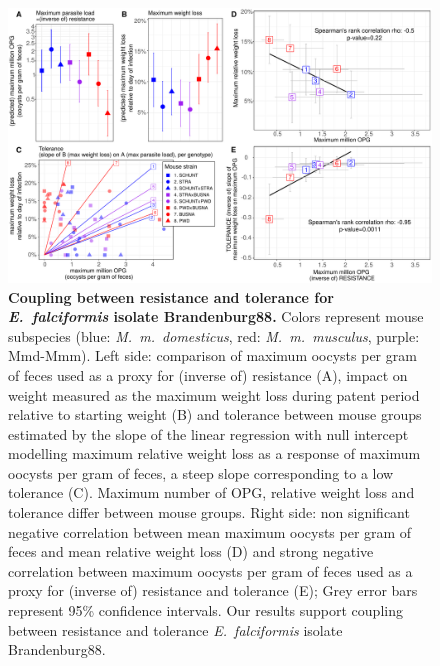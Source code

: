 \documentclass[12pt]{article}
\begin{document}
\begin{figure}[H]
    \centering
    \includegraphics[width=\linewidth,height=\textheight,keepaspectratio]{images/Fig5_final.pdf}
    \caption{\textbf{Coupling between resistance and tolerance for \textit{E.~falciformis} isolate Brandenburg88.} Colors represent mouse subspecies (blue: \textit{M.~m.~domesticus}, red: \textit{M.~m.~musculus}, purple: Mmd-Mmm). Left side: comparison of maximum oocysts per gram of feces used as a proxy for (inverse of) resistance (A), impact on weight measured as the maximum weight loss during patent period relative to starting weight (B) and tolerance between mouse groups estimated by the slope of the linear regression with null intercept modelling maximum relative weight loss as a response of maximum oocysts per gram of feces, a steep slope corresponding to a low tolerance (C). Maximum number of OPG, relative weight loss and tolerance differ between mouse groups. Right side: non significant negative correlation between mean maximum oocysts per gram of feces and mean relative weight loss (D) and strong negative correlation between maximum oocysts per gram of feces used as a proxy for (inverse of) resistance and tolerance (E); Grey error bars represent 95\% confidence intervals. Our results support coupling between resistance and tolerance \textit{E.~falciformis} isolate Brandenburg88.}
\end{figure}
\end{document}
